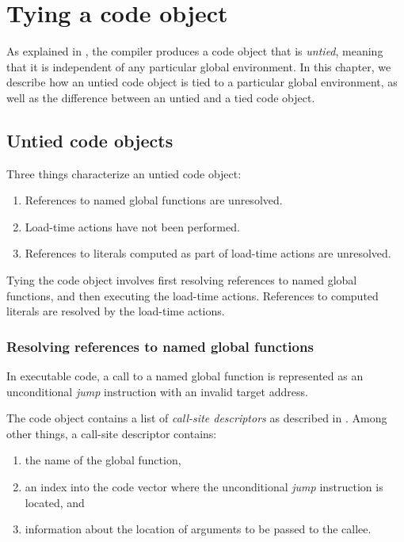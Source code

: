 \chapter{Tying a code object}
\label{chap-tying-a-code-object}

As explained in , the compiler produces a code
object  that is
\emph{untied}, meaning that it is independent of any particular global
environment.  In this chapter, we describe how an untied code object
is tied to a particular global environment, as well as the difference
between an untied and a tied code object.

\section{Untied code objects}

Three things characterize an untied code object:

\begin{enumerate}
\item References to named global functions are unresolved.
\item Load-time actions have not been performed.
\item References to literals computed as part of load-time actions are
  unresolved.
\end{enumerate}

Tying the code object involves first resolving references to named
global functions, and then executing the load-time actions.
References to computed literals are resolved by the load-time actions.

\subsection{Resolving references to named global functions}

In executable code, a call to a named global function is represented
as an unconditional \emph{jump} instruction with an invalid target
address.

The code object contains a list of \emph{call-site descriptors} as
described in .  Among other things,
a call-site descriptor contains:

\begin{enumerate}
\item the name of the global function,
\item an index into the code vector where the unconditional
  \emph{jump} instruction is located, and
\item information about the location of arguments to be passed to the
  callee.
\end{enumerate}

